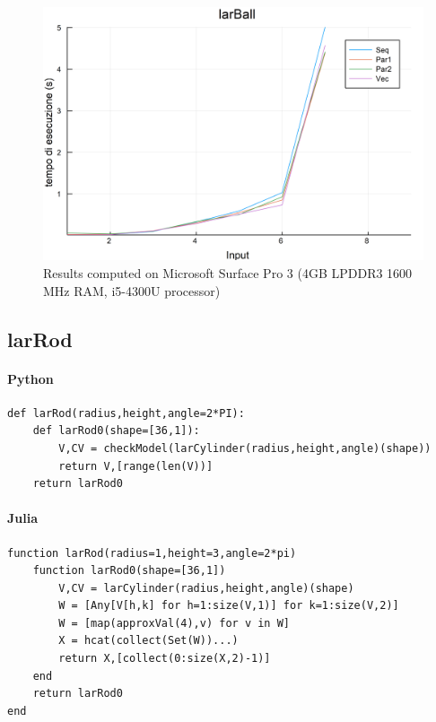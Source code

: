 \documentclass{article}
\begin{document}
\begin{figure}[htbp] 
\centering 
\includegraphics[scale=.13]{larBallTime.png} 
\caption{Results computed on Microsoft Surface Pro  3 (4GB LPDDR3 1600 MHz RAM, i5-4300U processor)} 
\end{figure}

\subsection{larRod}

\paragraph{Python}

\begin{verbatim}
def larRod(radius,height,angle=2*PI):
    def larRod0(shape=[36,1]):
        V,CV = checkModel(larCylinder(radius,height,angle)(shape))
        return V,[range(len(V))]
    return larRod0	
\end{verbatim}

\paragraph{Julia}

\begin{verbatim}
function larRod(radius=1,height=3,angle=2*pi)
    function larRod0(shape=[36,1])
        V,CV = larCylinder(radius,height,angle)(shape)
        W = [Any[V[h,k] for h=1:size(V,1)] for k=1:size(V,2)]
        W = [map(approxVal(4),v) for v in W]
        X = hcat(collect(Set(W))...)
        return X,[collect(0:size(X,2)-1)]
    end
    return larRod0
end
\end{verbatim}
\end{document}

